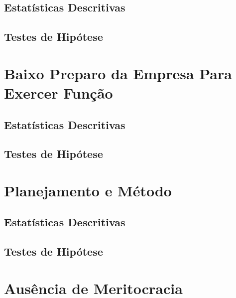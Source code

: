 \documentclass[]{book}
\begin{document}
\hypertarget{estatisticas-descritivas-3}{%
\subsection{Estatísticas Descritivas}\label{estatisticas-descritivas-3}}

\hypertarget{testes-de-hipotese-3}{%
\subsection{Testes de Hipótese}\label{testes-de-hipotese-3}}

\hypertarget{baixo-preparo-da-empresa-para-exercer-funcao-1}{%
\section{Baixo Preparo da Empresa Para Exercer Função}\label{baixo-preparo-da-empresa-para-exercer-funcao-1}}

\hypertarget{estatisticas-descritivas-4}{%
\subsection{Estatísticas Descritivas}\label{estatisticas-descritivas-4}}

\hypertarget{testes-de-hipotese-4}{%
\subsection{Testes de Hipótese}\label{testes-de-hipotese-4}}

\hypertarget{planejamento-e-metodo-1}{%
\section{Planejamento e Método}\label{planejamento-e-metodo-1}}

\hypertarget{estatisticas-descritivas-5}{%
\subsection{Estatísticas Descritivas}\label{estatisticas-descritivas-5}}

\hypertarget{testes-de-hipotese-5}{%
\subsection{Testes de Hipótese}\label{testes-de-hipotese-5}}

\hypertarget{ausencia-de-meritocracia-1}{%
\section{Ausência de Meritocracia}\label{ausencia-de-meritocracia-1}}
\end{document}
